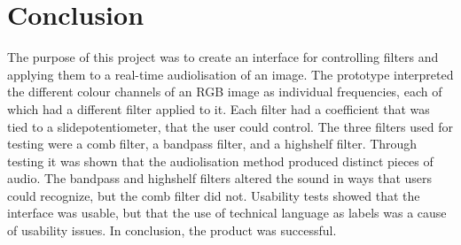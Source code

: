 \chapter{Conclusion}\label{ch:conclusion}
The purpose of this project was to create an interface for controlling filters and applying them to a real-time audiolisation of an image. The prototype interpreted the different colour channels of an RGB image as individual frequencies, each of which had a different filter applied to it. Each filter had a coefficient that was tied to a slidepotentiometer, that the user could control. The three filters used for testing were a comb filter, a bandpass filter, and a highshelf filter. Through testing it was shown that the audiolisation method produced distinct pieces of audio. The bandpass and highshelf filters altered the sound in ways that users could recognize, but the comb filter did not. Usability tests showed that the interface was usable, but that the use of technical language as labels was a cause of usability issues. In conclusion, the product was successful.
